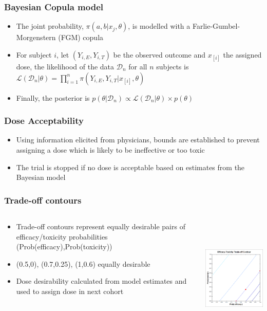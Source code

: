 \documentclass{beamer}
\begin{document}
	\begin{frame}
		\frametitle{Bayesian Copula model} 
		\begin{itemize}
			\setlength\itemsep{2em}
			\item The joint probability, $\pi(a,b|x_j,\theta)$, is modelled with a Farlie-Gumbel-Morgenstern (FGM) copula
			\item For subject $i$, let $(Y_{i,E},Y_{i,T})$ be the observed outcome and $x_{[i]}$ the assigned dose, the likelihood of the data $\mathcal{D}_n$ for all $n$ subjects is
			$\mathcal{L}(\mathcal{D}_n|\theta)=\prod_{i=1}^{n}\pi(Y_{i,E},Y_{i,T}|x_{[i]},\theta)$
			\item Finally, the posterior is $p(\theta|\mathcal{D}_n) \propto \mathcal{L}(\mathcal{D}_n|\theta) \times p(\theta)$
		\end{itemize}
	\end{frame}	
	
	\begin{frame}
		\frametitle{Dose Acceptability} 
		\begin{itemize}
			\setlength\itemsep{2em}
			\item Using information elicited from physicians, bounds are established to prevent assigning a dose which is likely to be ineffective or too toxic
			\item The trial is stopped if no dose is acceptable based on estimates from the Bayesian model 
		\end{itemize}
	\end{frame}
	
	\begin{frame}
		\frametitle{Trade-off contours} 
		\begin{columns}[T]
			\begin{column}{.5\textwidth}			
				\begin{itemize}
					\setlength\itemsep{1em}
					\item Trade-off contours represent equally desirable pairs of efficacy/toxicity probabilities (Prob(efficacy),Prob(toxicity))
					\item (0.5,0), (0.7,0.25), (1,0.6) equally desirable
					\item Dose desirability calculated from model estimates and used to assign dose in next cohort
				\end{itemize}
			\end{column}
			\begin{column}{.5\textwidth}
				\includegraphics[height=5.8cm]{fig/image046}
			\end{column}
		\end{columns}		
	\end{frame}	
\end{document}
